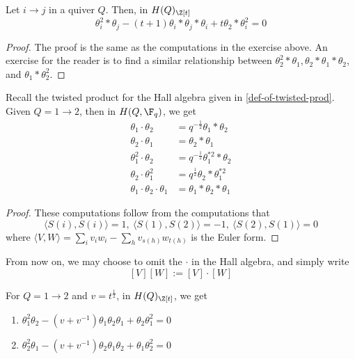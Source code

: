 \documentclass[11pt,leqno,oneside]{amsbook}
\numberwithin{thm}{section}
\renewcommand{\Q}{Q} %
\begin{document}
  \begin{prop}\label{normal-prod-reln}
    Let \(i \to j\) in a quiver \(\Q\). Then, in \(H(\Q)_{\Z[t]}\)\[
      \theta_i^2 * \theta_j - (t+1) \theta_i * \theta_j * \theta_i + t
      \theta_2 * \theta_i^2 = 0
    \]
  \end{prop}
  \begin{proof}
    The proof is the same as the computations in the exercise
    above. An exercise for the reader is to find a similar
    relationship between \(\theta_2^2 * \theta_1, \theta_2 * \theta_1
    * \theta_2\), and \(\theta_1*\theta_2^2\).
  \end{proof}
  \begin{prop}
    Recall the twisted product for the Hall algebra given in
    \ref{def-of-twisted-prod}. Given \(\Q = 1 \to
    2\), then in \(H(\Q,\F_q)\), we get
    \begin{align*}
      \theta_1 \cdot \theta_2 & = q^{-\frac{1}{2}} \theta_1 * \theta_2
      \\
      \theta_2 \cdot \theta_1 & = \theta_2 * \theta_1 \\
      \theta_1^2 \cdot \theta_2 & = q^{-\frac{1}{2}}\theta_1^{*2} * \theta_2 \\
      \theta_2 \cdot \theta_1^2 & = q^{\frac{1}{2}} \theta_2 *
                                  \theta_1^{*2} \\
      \theta_1 \cdot \theta_2 \cdot \theta_1 & = \theta_1 * \theta_2 *
                                               \theta_1 
    \end{align*}
  \end{prop}
  \begin{proof}
    These computations follow from the computations that \[
      \langle S(i), S(i) \rangle = 1, \ \langle S(1), S(2) \rangle =
      -1, \ \langle S(2), S(1) \rangle = 0
    \]
    where \(\langle V,W \rangle = \sum_i v_i w_i - \sum_h v_{s(h)}
    w_{t(h)}\) is the Euler form.
  \end{proof}
  \begin{rmk}
    From now on, we may choose to omit the \(\cdot\) in the Hall
    algebra, and simply write \[
      [V] [W] := [V] \cdot [W]
    \]
  \end{rmk}
  \begin{cor}
    For \(\Q = 1 \to 2\) and \(v = t^{\frac{1}{2}}\), in
    \(H(\Q)_{\Z[t]}\), we get
    \begin{enumerate}
    \item \(\theta_1^2 \theta_2 - (v+v^{-1})\theta_1 \theta_2 \theta_1
      + \theta_2 \theta_1^2 = 0\)
    \item \(\theta_2^2 \theta_1 - (v+v^{-1}) \theta_2 \theta_1
      \theta_2 + \theta_1 \theta_2^2 = 0\)
    \end{enumerate}
  \end{cor}
\end{document}
